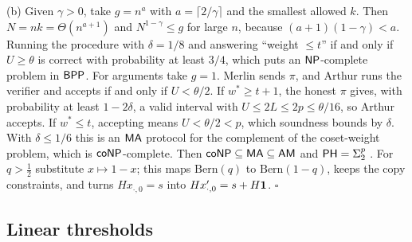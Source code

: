 (b) Given $\gamma>0$, take $g=n^a$ with $a=\lceil2/\gamma\rceil$ and the smallest
allowed $k$. Then $N=nk=\Theta(n^{a+1})$ and $N^{1-\gamma}\le g$ for large $n$, because
$(a+1)(1-\gamma)<a$. Running the procedure with $\delta=1/8$ and answering ``weight
$\le t$'' if and only if $U\ge\theta$ is correct with probability at least $3/4$, which
puts an $\mathsf{NP}$-complete problem in $\mathsf{BPP}$. For arguments take $g=1$. Merlin sends
$\pi$, and Arthur runs the verifier and accepts if and only if $U<\theta/2$. If
$w^*\ge t+1$, the honest $\pi$ gives, with probability at least $1-2\delta$, a valid
interval with $U\le2L\le2p\le\theta/16$, so Arthur accepts. If $w^*\le t$, accepting
means $U<\theta/2<p$, which soundness bounds by $\delta$. With $\delta\le1/6$ this is an
$\mathsf{MA}$ protocol for the complement of the coset-weight problem, which is
$\mathsf{coNP}$-complete. Then $\mathsf{coNP}\subseteq\mathsf{MA}\subseteq\mathsf{AM}$ and $\mathsf{PH}=\Sigma_2^p$
\cite{bhz1987}. For $q>\frac12$ substitute $x\mapsto1-x$; this maps
$\mathrm{Bern}(q)$ to $\mathrm{Bern}(1-q)$, keeps the copy constraints, and turns
$Hx_{\cdot,0}=s$ into $Hx'_{\cdot,0}=s+H\mathbf{1}$.
\hfill$\square$

\subsection{Linear thresholds}

